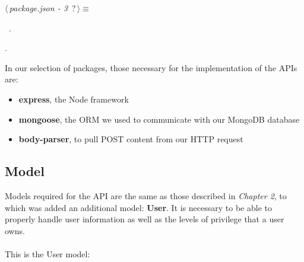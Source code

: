 \begin{flushleft} \small
\begin{minipage}{\linewidth}\label{scrap3}\raggedright\small
{} $\langle\,${\itshape {package.json - 3}}\nobreak\ {\footnotesize {?}}$\,\rangle\equiv$
\vspace{-1ex}
\begin{list}{}{} \item

                
        {\NWsep}
\end{list}
\vspace{-1.5ex}
\footnotesize
\begin{list}{}{\setlength{\itemsep}{-\parsep}\setlength{\itemindent}{-\leftmargin}}
\item \NWtxtMacroDefBy\ .
\item {\NWtxtMacroNoRef}.

\item{}
\end{list}
\end{minipage}\vspace{4ex}
\end{flushleft}
In our selection of packages, those necessary for the implementation of the APIs are:

\begin{itemize}
	\item \textbf{express}, the Node framework
	\item \textbf{mongoose}, the ORM we used to communicate with our MongoDB database
	\item \textbf{body-parser}, to pull POST content from our HTTP request
\end{itemize}

\subsection{Model}

Models required for the API are the same as those described in \emph{Chapter 2}, to which was added an additional model: \textbf{User}. It is necessary to be able to properly handle user information as well as the levels of privilege that a user owns. 
\\
\\This is the User model:

